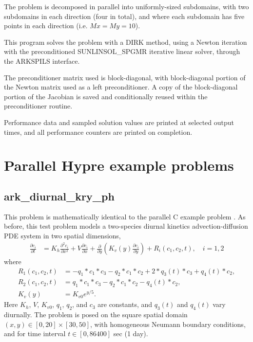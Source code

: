 \documentclass[letterpaper,10pt,english]{sphinxmanual}
\begin{document}
The problem is decomposed in parallel into uniformly-sized subdomains,
with two subdomains in each direction (four in total), and where each
subdomain has five points in each direction (i.e. \(Mx=My=10\)).

This program solves the problem with a DIRK method, using a Newton
iteration with the preconditioned SUNLINSOL\_SPGMR iterative linear
solver, through the ARKSPILS interface.

The preconditioner matrix used is block-diagonal, with block-diagonal
portion of the Newton matrix used as a left preconditioner.  A copy of
the block-diagonal portion of the Jacobian is saved and conditionally
reused within the preconditioner routine.

Performance data and sampled solution values are printed at
selected output times, and all performance counters are printed
on completion.


\chapter{Parallel Hypre example problems}
\label{\detokenize{c_parhyp::doc}}\label{\detokenize{c_parhyp:parallel-hypre-example-problems}}\label{\detokenize{c_parhyp:parhyp-c}}

\section{ark\_diurnal\_kry\_ph}
\label{\detokenize{c_parhyp:ark-diurnal-kry-ph}}\label{\detokenize{c_parhyp:id1}}
This problem is mathematically identical to the parallel C example
problem {\hyperref[\detokenize{c_parallel:ark-diurnal-kry-p}]{}}.  As before, this test problem models
a two-species diurnal kinetics advection-diffusion PDE system in two
spatial dimensions,
\begin{equation*}
\begin{split}\frac{\partial c_i}{\partial t} &=
  K_h \frac{\partial^2 c_i}{\partial x^2} +
  V \frac{\partial     c_i}{\partial x} +
  \frac{\partial}{\partial y}\left( K_v(y)
  \frac{\partial c_i}{\partial y}\right) +
  R_i(c_1,c_2,t),\quad i=1,2\end{split}
\end{equation*}
where
\begin{equation*}
\begin{split}R_1(c_1,c_2,t) &= -q_1*c_1*c_3 - q_2*c_1*c_2 + 2*q_3(t)*c_3 + q_4(t)*c_2, \\
R_2(c_1,c_2,t) &=  q_1*c_1*c_3 - q_2*c_1*c_2 - q_4(t)*c_2, \\
K_v(y) &= K_{v0} e^{y/5}.\end{split}
\end{equation*}
Here \(K_h\), \(V\), \(K_{v0}\), \(q_1\), \(q_2\),
and \(c_3\) are constants, and \(q_3(t)\) and \(q_4(t)\)
vary diurnally.  The problem is posed on the square spatial domain
\((x,y) \in [0,20]\times[30,50]\), with homogeneous Neumann
boundary conditions, and for time interval \(t\in [0,86400]\) sec
(1 day).
\end{document}

